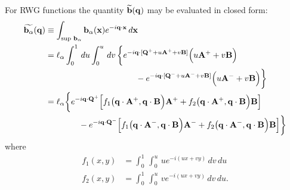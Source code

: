 \documentclass[letterpaper]{article}
\newcommand{\wt}{\widetilde}
\begin{document}
For RWG functions the quantity $\wt{\vb b}(\vb q)$
may be evaluated in closed form:
\begin{align*}
\wt{\vb b_\alpha}(\vb q)
&\equiv
\int_{\text{sup } \vb b_\alpha}
  \vb b_\alpha(\vb x)e^{-i\vb q \cdot \vb x} \, d\vb x
\\
&=\ell_\alpha
  \int_0^1 \, du \int_0^u \, dv \,
  \bigg\{
  e^{-i\vb q\cdot [\vb Q^+ + u \vb A^+ + v\vb B]}
  \Big(u\vb A^+ + v\vb B\Big)
\\ 
  &\hspace{1.5in}
  - 
  e^{-i\vb q\cdot [\vb Q^- + u \vb A^- + v\vb B]}
  \Big(u\vb A^- + v\vb B\Big)
  \bigg\}
\\
&=\ell_\alpha\bigg\{ 
  e^{-i\vb q \cdot \vb Q^+} 
  \Big[ f_1\big(\vb q\cdot \vb A^+, \vb q\cdot \vb B\Big) 
           \vb A^+
       +f_2\big(\vb q\cdot \vb A^+, \vb q\cdot \vb B\Big)
           \vb B
  \Big]
\\
&\qquad\qquad
  -
  e^{-i\vb q \cdot \vb Q^-} 
  \Big[ f_1\big(\vb q\cdot \vb A^-, \vb q\cdot \vb B\Big)
           \vb A^-
       +f_2\big(\vb q\cdot \vb A^-, \vb q\cdot \vb B\Big)
           \vb B
  \Big]\bigg\}
\end{align*}
where
\begin{align*}
 f_1(x, y)&=\int_0^1 \, \int_0^u \, u e^{-i (ux + vy)} \,dv\,du  
\\
 f_2(x, y)&=\int_0^1 \, \int_0^u \, v e^{-i (ux + vy)} \,dv\,du.
\end{align*}
\end{document}
